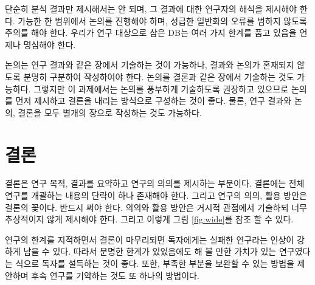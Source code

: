 단순히 분석 결과만 제시해서는 안 되며, 그 결과에 대한 연구자의 해석을 제시해야 한다. 가능한 한 범위에서 논의를 진행해야 하며, 성급한 일반화의 오류를 범하지 않도록 주의를 해야 한다. 우리가 연구 대상으로 삼은 DB는 여러 가지 한계를 품고 있음을 언제나 명심해야 한다.

논의는 연구 결과와 같은 장에서 기술하는 것이 가능하나, 결과와 논의가 혼재되지 않도록 분명히 구분하여 작성하여야 한다. 논의를 결론과 같은 장에서 기술하는 것도 가능하다. 그렇지만 이 과제에서는 논의를 풍부하게 기술하도록 권장하고 있으므로 논의를 먼저 제시하고 결론을 내리는 방식으로 구성하는 것이 좋다. 물론, 연구 결과와 논의, 결론을 모두 별개의 장으로 작성하는 것도 가능하다.

\section{결론}
결론은 연구 목적, 결과를 요약하고 연구의 의의를 제시하는 부분이다. 결론에는 전체 연구를 개괄하는 내용의 단락이 하나 존재해야 한다. 그리고 연구의 의의, 활용 방안은 결론의 꽃이다. 반드시 써야 한다. 의의와 활용 방안은 거시적 관점에서 기술하되 너무 추상적이지 않게 제시해야 한다. 그리고 이렇게 그림 \ref{fig:wide}를 참조 할 수 있다.

연구의 한계를 지적하면서 결론이 마무리되면 독자에게는 실패한 연구라는 인상이 강하게 남을 수 있다. 따라서 분명한 한계가 있었음에도 해 볼 만한 가치가 있는 연구였다는 식으로 독자를 설득하는 것이 좋다. 또한, 부족한 부분을 보완할 수 있는 방법을 제안하며 후속 연구를 기약하는 것도 또 하나의 방법이다.